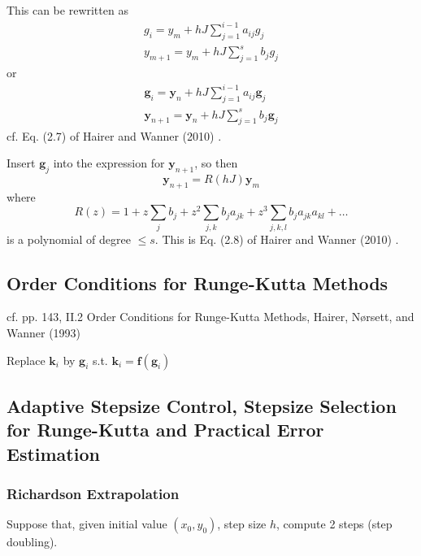 \documentclass[10pt]{amsart}
\begin{document}
\begin{multicols*}{2}
This can be rewritten as
\begin{equation}
\begin{gathered}
	g_i = y_m + h J \sum_{j=1}^{i-1} a_{ij} g_j  \\
	y_{m+1} = y_m + hJ \sum_{j=1}^s b_j g_j
\end{gathered}
\end{equation}
or 
\begin{equation}
	\begin{gathered}
		\mathbf{g}_i = \mathbf{y}_n + hJ \sum_{j=1}^{i-1}a_{ij} \mathbf{g}_j \\
	\mathbf{y}_{n+1} = \mathbf{y}_n + h J \sum_{j=1}^s b_j \mathbf{g}_j
	\end{gathered}
\end{equation}
cf. Eq. (2.7) of Hairer and Wanner (2010) \cite{HaWa2010}.

Insert $\mathbf{g}_j$ into the expression for $\mathbf{y}_{n+1}$, so then
\begin{equation}
	\mathbf{y}_{n+1} = R(hJ) \mathbf{y}_m
\end{equation}
where
\begin{equation}
	R(z) = 1 + z \sum_j b_j + z^2 \sum_{j, k} b_j a_{jk} + z^3 \sum_{j,k,l} b_j a_{jk} a_{kl} + \dots
\end{equation}
is a polynomial of degree $\leq s$. This is Eq. (2.8) of Hairer and Wanner (2010) \cite{HaWa2010}.

\subsection{Order Conditions for Runge-Kutta Methods}

cf. pp. 143, II.2 Order Conditions for Runge-Kutta Methods, Hairer, N\o rsett, and Wanner (1993) \cite{HNW1993}

Replace $\mathbf{k}_i$ by $\mathbf{g}_i$ s.t. $\mathbf{k}_i = \mathbf{f}(\mathbf{g}_i)$

\subsection{Adaptive Stepsize Control, Stepsize Selection for Runge-Kutta and Practical Error Estimation}

\subsubsection{Richardson Extrapolation}

Suppose that, given initial value $(x_0, y_0)$, step size $h$, compute 2 steps (step doubling). \\


\end{multicols*}
\end{document}
